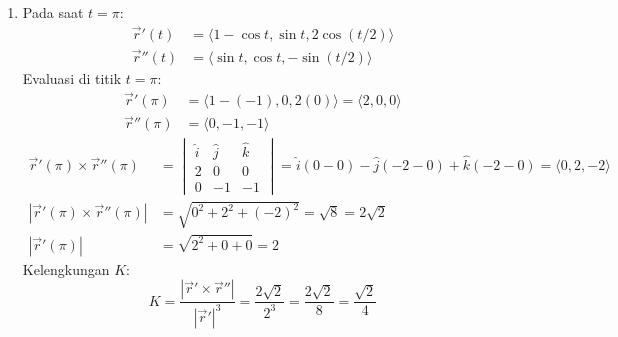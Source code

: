 \documentclass[11pt,letterpaper]{article}
\begin{document}
\begin{enumerate}
\begin{enumerate}[label=\alph*.]
\begin{center}
                \end{center}

          \item Pada saat $t = \pi$:
                \begin{align*}
                  \vec{r}'(t)  & = \langle 1 - \cos t, \sin t, 2\cos(t/2) \rangle \\
                  \vec{r}''(t) & = \langle \sin t, \cos t, -\sin(t/2) \rangle
                \end{align*}
                Evaluasi di titik $t = \pi$:
                \begin{align*}
                  \vec{r}'(\pi)  & = \langle 1 - (-1), 0, 2(0) \rangle = \langle 2, 0, 0 \rangle \\
                  \vec{r}''(\pi) & = \langle 0, -1, -1 \rangle
                \end{align*}
                \begin{align*}
                  \vec{r}'(\pi) \times \vec{r}''(\pi)   & = \begin{vmatrix} \hat{i} & \hat{j} & \hat{k} \\ 2 & 0 & 0 \\ 0 & -1 & -1 \end{vmatrix} = \hat{i}(0-0) - \hat{j}(-2-0) + \hat{k}(-2-0) = \langle 0, 2, -2 \rangle \\
                  |\vec{r}'(\pi) \times \vec{r}''(\pi)| & = \sqrt{0^2 + 2^2 + (-2)^2} = \sqrt{8} = 2\sqrt{2}                                                                                                                \\
                  |\vec{r}'(\pi)|                       & = \sqrt{2^2 + 0 + 0} = 2
                \end{align*}
                Kelengkungan $K$:
                \[ K = \frac{|\vec{r}' \times \vec{r}''|}{|\vec{r}'|^3} = \frac{2\sqrt{2}}{2^3} = \frac{2\sqrt{2}}{8} = \frac{\sqrt{2}}{4} \]
        \end{enumerate}


\end{enumerate}
\end{document}
